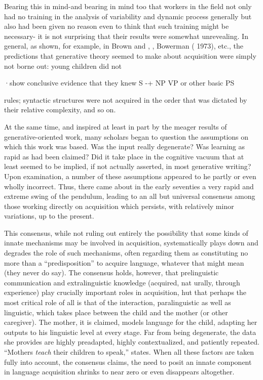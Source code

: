 Bearing this in mind-and bearing in mind too that workers in the field not only had no training in the analysis of variability and dynamic process generally but also had been given no reason even to think that such training might be necessary- it is not surprising that their results were somewhat unrevealing. In general, as shown, for example, in Brown and \citet{Hanlon1970}, \citet{Brown1973}, Bowerman ( 1973), etc., the predictions that generative theory seemed to make about acquisition were simply not borne out: young children did not

·show conclusive evidence that they knew S {}-+ NP VP or other basic PS


rules; syntactic structures were not acquired in the order that was dictated by their relative complexity, and so on.

At the same time, and inspired at least in part by the meager results of generative-oriented work, many scholars began to question the assumptions on which this work was based. Was the input really degenerate? Was learning as rapid as had been claimed? Did it take place in the cognitive vacuum that at least seemed to be implied, if not actually asserted, in most generative writing? Upon examination, a number of these assumptions appeared to he partly or even wholly incorrect. Thus, there came about in the early seventies a very rapid and extreme swing of the pendulum, leading to an all but universal consensus among those working directly on acquisition which persists, with relatively minor variations, up to the present.

This consensus, while not ruling out entirely the possibility that some kinds of innate mechanisms may be involved in acquisition, systematically plays down and degrades the role of such mechanisms, often regarding them as constituting no more than a ``predisposition'' to acquire language, whatever that might mean (they never do say). The consensus holds, however, that prelinguistic communication and extralinguistic knowledge (acquired, nat urally, through experience) play crucially important roles in acquisition, hut that perhaps the most critical role of all is that of the interaction, paralinguistic as well as linguistic, which takes place between the child and the mother (or other caregiver). The mother, it is claimed, models language for the child, adapting her outputs to his linguistic level at every stage. Far from being degenerate, the data she provides are highly preadapted, highly contextualized, and patiently repeated. ``Mothers \textit{teach} their children to speak,'' \citet{Bruner1979} states. When all these factors are taken fully into account, the consensus claims, the need to posit an innate component in language acquisition shrinks to near zero or even disappears altogether.

